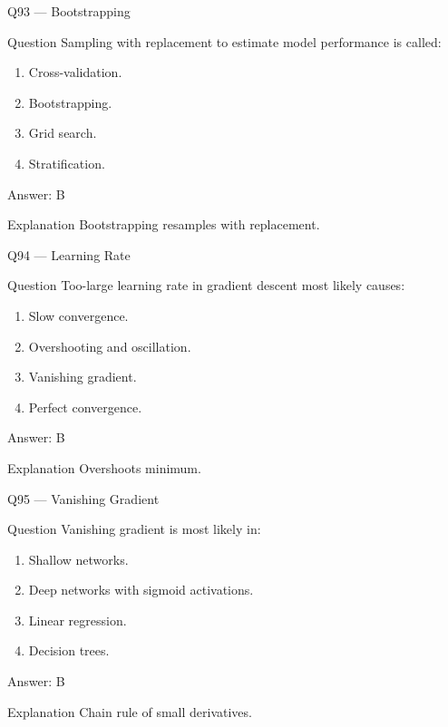 \documentclass[aspectratio=169,8pt]{beamer}
\begin{document}
	\begin{frame}{Q93 --- Bootstrapping}
		\begin{block}{Question}
			Sampling with replacement to estimate model performance is called:
		\end{block}
		\begin{enumerate}
			\item Cross-validation.
			\item Bootstrapping.
			\item Grid search.
			\item Stratification.
		\end{enumerate}
		\begin{exampleblock}{Answer: B}\end{exampleblock}
		\begin{block}{Explanation}
			Bootstrapping resamples with replacement.
		\end{block}
	\end{frame}
	
	\begin{frame}{Q94 --- Learning Rate}
		\begin{block}{Question}
			Too-large learning rate in gradient descent most likely causes:
		\end{block}
		\begin{enumerate}
			\item Slow convergence.
			\item Overshooting and oscillation.
			\item Vanishing gradient.
			\item Perfect convergence.
		\end{enumerate}
		\begin{exampleblock}{Answer: B}\end{exampleblock}
		\begin{block}{Explanation}
			Overshoots minimum.
		\end{block}
	\end{frame}
	
	\begin{frame}{Q95 --- Vanishing Gradient}
		\begin{block}{Question}
			Vanishing gradient is most likely in:
		\end{block}
		\begin{enumerate}
			\item Shallow networks.
			\item Deep networks with sigmoid activations.
			\item Linear regression.
			\item Decision trees.
		\end{enumerate}
		\begin{exampleblock}{Answer: B}\end{exampleblock}
		\begin{block}{Explanation}
			Chain rule of small derivatives.
		\end{block}
	\end{frame}
	
\end{document}
